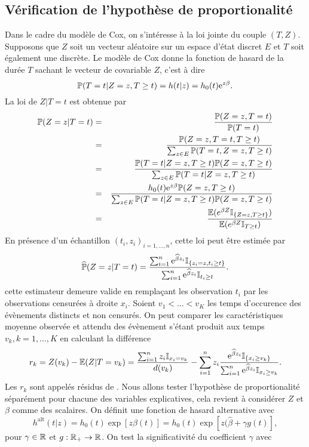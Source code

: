 \subsection{Vérification de l'hypothèse de proportionalité}
Dans le cadre du modèle de Cox, on s'intéresse à la loi jointe du couple $(T,Z)$. Supposons que $Z$ soit un vecteur aléatoire sur un espace d'état discret $E$ et $T$ soit également une \va discrète. Le modèle de Cox donne la fonction de hasard de la durée $T$ sachant le vecteur de covariable $Z$, c'est à dire 
$$
\mathbb{P}(T = t|Z =z,T\geq t) = h(t|z) = h_0(t)\mathrm{e}^{z\beta}.
$$
La loi de $Z|T=t$ est obtenue par 
\begin{eqnarray*}
\mathbb{P}(Z=z|T=t) &=& \frac{\mathbb{P}(Z=z,T=t)}{\mathbb{P}(T=t)}\\
&=&\frac{\mathbb{P}(Z=z,T=t, T\geq t)}{\sum_{z\in E}\mathbb{P}(T=t, Z=z, T\geq t)} \\
&=& \frac{\mathbb{P}(T=t|Z=z,T\geq t)\mathbb{P}(Z=z,T\geq t)}{\sum_{z\in E}\mathbb{P}(T=t| Z=z, T\geq t)}\\
&=& \frac{h_0(t)\mathrm{e}^{z\beta}\mathbb{P}(Z=z,T\geq t)}{\sum_{z\in E}\mathbb{P}(T=t| Z=z, T\geq t)\mathbb{P}(Z=z, T\geq t)}\\
&=&\frac{\mathbb{E}(e^{\beta Z}\mathbb{I}_{\{Z = z, T\geq t\}})}{\mathbb{E}(e^{\beta Z}\mathbb{I}_{T\geq t})}
\end{eqnarray*}
En présence d'un échantillon \iid $(t_i, z_i)_{i = 1,\ldots, n}$, cette loi peut être estimée par 
$$
\widehat{\mathbb{P}}(Z=z|T=t) = \frac{\sum_{i = 1}^n\mathrm{e}^{\widehat{\beta} z_i}\mathbb{I}_{\{ z_i = z, t_i\geq t\}}}{\sum_{i = 1}^n \mathrm{e}^{\widehat{\beta} z_i}\mathbb{I}_{t_i\geq t}}.
$$
cette estimateur demeure valide en remplaçant les observation $t_i$ par les observations censurées à droite $x_i$. Soient $v_1<\ldots < v_K$ les temps d'occurence des évènements distincts et non censurés. On peut comparer les caractéristiques moyenne observée et attendu des évènement s'étant produit aux temps $v_k,k=1,\ldots, K$ en calculant la différence
$$
r_k = Z(v_k) - \mathbb{E}(Z|T = v_k) = \frac{\sum_{i=1}^nz_i\mathbb{I}_{x_i = v_k}}{d(v_k)}  - \sum_{i = 1}^nz_i\frac{\mathrm{e}^{\widehat{\beta} z_i}\mathbb{I}_{\{ x_i\geq v_k\}}}{\sum_{i = 1}^n \mathrm{e}^{\widehat{\beta} z_i}\mathbb{I}_{x_i\geq v_k}}.
$$
Les $r_k$ sont appelés résidus de \citet{SCHOENFELD1982}. Nous allons tester l'hypothèse de proportionalité séparément pour chacune des variables explicatives, cela revient à considérer $Z$ et $\beta$ comme des scalaires. On définit une fonction de hasard alternative avec 
$$
h^{\text{alt}}(t|z) = h_0(t)\exp[z\beta(t)] = h_0(t)\exp[z(\widehat{\beta}+\gamma g(t)],
$$
pour $\gamma\in \mathbb{R}$ et $g:\mathbb{R}_+\rightarrow\mathbb{R}$. On test la significativité du coefficient $\gamma$ avec 
